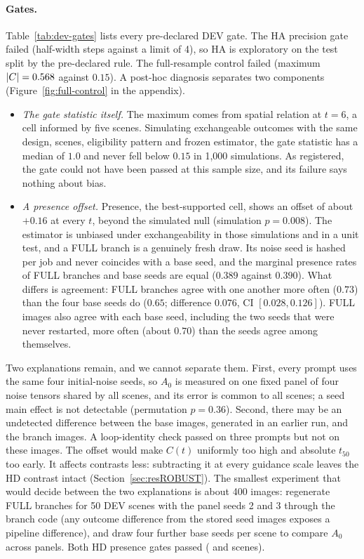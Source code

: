 \paragraph{Gates.} Table~\ref{tab:dev-gates} lists every pre-declared DEV gate. The HA precision gate failed (half-width \haHalfwidth{} steps against a limit of 4), so HA is exploratory on the test split by the pre-declared rule. The full-resample control failed (maximum $|C|=0.568$ against $0.15$). A post-hoc diagnosis separates two components (Figure~\ref{fig:full-control} in the appendix).
\begin{itemize}
\item \emph{The gate statistic itself.} The maximum comes from spatial relation at $t=6$, a cell informed by five scenes. Simulating exchangeable outcomes with the same design, scenes, eligibility pattern and frozen estimator, the gate statistic has a median of $1.0$ and never fell below $0.15$ in 1{,}000 simulations. As registered, the gate could not have been passed at this sample size, and its failure says nothing about bias.
\item \emph{A presence offset.} Presence, the best-supported cell, shows an offset of about $+0.16$ at every $t$, beyond the simulated null (simulation $p=0.008$). The estimator is unbiased under exchangeability in those simulations and in a unit test, and a FULL branch is a genuinely fresh draw. Its noise seed is hashed per job and never coincides with a base seed, and the marginal presence rates of FULL branches and base seeds are equal ($0.389$ against $0.390$). What differs is agreement: FULL branches agree with one another more often ($0.73$) than the four base seeds do ($0.65$; difference $0.076$, CI $[0.028,0.126]$). FULL images also agree with each base seed, including the two seeds that were never restarted, more often (about $0.70$) than the seeds agree among themselves.
\end{itemize}
Two explanations remain, and we cannot separate them. First, every prompt uses the same four initial-noise seeds, so $A_0$ is measured on one fixed panel of four noise tensors shared by all scenes, and its error is common to all scenes; a seed main effect is not detectable (permutation $p=0.36$). Second, there may be an undetected difference between the base images, generated in an earlier run, and the branch images. A loop-identity check passed on three prompts but not on these images. The offset would make $C(t)$ uniformly too high and absolute $t_{50}$ too early. It affects contrasts less: subtracting it at every guidance scale leaves the HD contrast intact (Section~\ref{sec:resROBUST}). The smallest experiment that would decide between the two explanations is about 400 images: regenerate FULL branches for 50 DEV scenes with the panel seeds 2 and 3 through the branch code (any outcome difference from the stored seed images exposes a pipeline difference), and draw four further base seeds per scene to compare $A_0$ across panels. Both HD presence gates passed (\hdPresTwo{} and \hdPresFifteen{} scenes).


